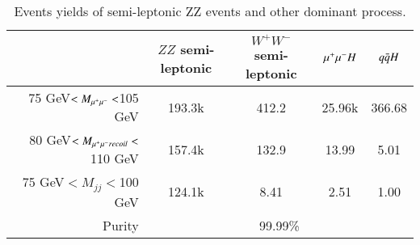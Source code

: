 \begin{table}
\label{tab:ZZ_mumuqq_valid}
\begin{tabular}{r|c|c|c|c}
             &   $ZZ$ semi-leptonic     &     $W^{+}W^{-}$ semi-leptonic     &       $\mu^{+}\mu^{-}H$     &   $q\bar{q}H$   \\ \hline
 75 GeV$<M_{\mu^{+}\mu^{-}}<$105 GeV
            &       193.3k              &      412.2     &   25.96k   & 366.68      \\ \hline
  80 GeV$<M_{\mu^{+}\mu^{-} recoil}<$110 GeV
            &       157.4k              &      132.9     &   13.99    &  5.01 \\ \hline
   75 GeV$<M_{jj}<$100 GeV 
            &       124.1k              &       8.41     &   2.51     &  1.00\\ \hline 
  Purity    &  \multicolumn{4}{c}{99.99\%}     \\ 
               
\end{tabular}
\caption{Events yields of semi-leptonic ZZ events and other dominant process.} 
\end{table}
  
  
 
